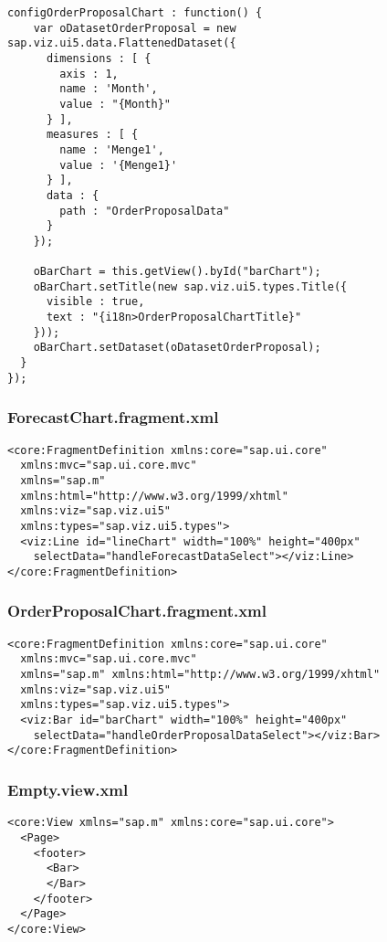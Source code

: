 \begin{lstlisting}[frame=htrbl, label=lst:Detail.controller.js]
  configOrderProposalChart : function() {
    var oDatasetOrderProposal = new sap.viz.ui5.data.FlattenedDataset({
      dimensions : [ {
        axis : 1,
        name : 'Month',
        value : "{Month}"
      } ],
      measures : [ {
        name : 'Menge1',
        value : '{Menge1}'
      } ],
      data : {
        path : "OrderProposalData"
      }
    });

    oBarChart = this.getView().byId("barChart");
    oBarChart.setTitle(new sap.viz.ui5.types.Title({
      visible : true,
      text : "{i18n>OrderProposalChartTitle}"
    }));
    oBarChart.setDataset(oDatasetOrderProposal);
  }
});
\end{lstlisting}

\subsubsection*{ForecastChart.fragment.xml}
\begin{lstlisting}[frame=htrbl, label=lst:ForecastChart.fragment.xml]
<core:FragmentDefinition xmlns:core="sap.ui.core"
  xmlns:mvc="sap.ui.core.mvc" 
  xmlns="sap.m" 
  xmlns:html="http://www.w3.org/1999/xhtml"
  xmlns:viz="sap.viz.ui5" 
  xmlns:types="sap.viz.ui5.types">
  <viz:Line id="lineChart" width="100%" height="400px"
    selectData="handleForecastDataSelect"></viz:Line>
</core:FragmentDefinition>
\end{lstlisting}

\subsubsection*{OrderProposalChart.fragment.xml}
\begin{lstlisting}[frame=htrbl, label=OrderProposalChart.fragment.xml]
<core:FragmentDefinition xmlns:core="sap.ui.core"
  xmlns:mvc="sap.ui.core.mvc" 
  xmlns="sap.m" xmlns:html="http://www.w3.org/1999/xhtml"
  xmlns:viz="sap.viz.ui5" 
  xmlns:types="sap.viz.ui5.types">
  <viz:Bar id="barChart" width="100%" height="400px"
    selectData="handleOrderProposalDataSelect"></viz:Bar>
</core:FragmentDefinition>
\end{lstlisting}

\subsubsection*{Empty.view.xml}
\begin{lstlisting}[frame=htrbl, label=lst:Empty.view.xml]
<core:View xmlns="sap.m" xmlns:core="sap.ui.core">
  <Page>
    <footer>
      <Bar>
      </Bar>
    </footer>
  </Page>
</core:View>
\end{lstlisting}

